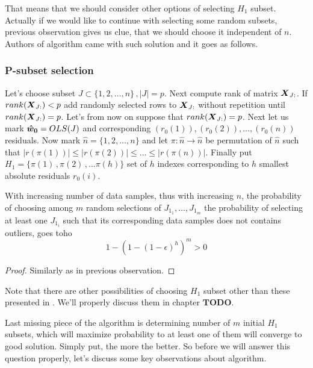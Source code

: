 That means that we should consider other options of selecting $H_1$ subset. Actually if we would like to continue with selecting some random subsets, previous observation gives us clue, that we should choose it independent of $n$. Authors of algorithm came with such solution and it goes as follows.

\subsubsection{P-subset selection}
Let's choose subset $J \subset \{{1,2,\ldots,n\}}\,, |J| = p$. Next compute rank of matrix $\m{X}_{J:}$. If $rank(\m{X}_{J:}) < p$ add randomly selected rows to $\m{X}_{J:}$ without repetition until $rank(\m{X}_{J:}) = p$. Let's from now on suppose that $rank(\m{X}_{J:}) = p$. Next let us mark $\boldsymbol{\hat{w}_0} = OLS(J)$ and corresponding $(r_0(1)), (r_0(2)), \ldots ,(r_0(n))$ residuals.  Now mark $\hat{n} = \{{1,2,\ldots,n\}}$ and let
$\pi: \hat{n} \rightarrow \hat{n}$ be permutation of $\hat{n}$ such that $|r({\pi(1)})| \leq |r({\pi(2)})| \leq \ldots \leq |r({\pi(n)})|$. Finally put $H_1 = \{{\pi(1)\,, \pi(2)\,,... \pi(h)\}}$ set of $h$ indexes corresponding to $h$ smallest absolute residuals $r_0(i)$.

\begin{observation}
	\label{cStepM}
	With increasing number of data samples, thus with increasing $n$, the probability of choosing among $m$ random selections of $J_{1_1}, \ldots ,J_{1_m}$ the probability of selecting
	at least one $J_{1_i}$ such that its corresponding data samples does not contains outliers, goes toho
	$$ 1-(1-(1-\epsilon)^h)^m  > 0$$
\end{observation}

\begin{proof}
	Similarly as in previous observation.
\end{proof}

\begin{itshape}
Note that there are other possibilities of choosing $H_1$ subset other than these presented in \cite{rouss:2000}.
We'll properly discuss them in chapter $\boldsymbol{TODO}$.\\
\end{itshape}

Last missing piece of the algorithm is determining number of $m$ initial $H_1$ subsets, which will maximize probability to at least one of them will converge to good solution. Simply put, the more the better. So before we will answer this question properly, let's discuss some key observations about algorithm.

